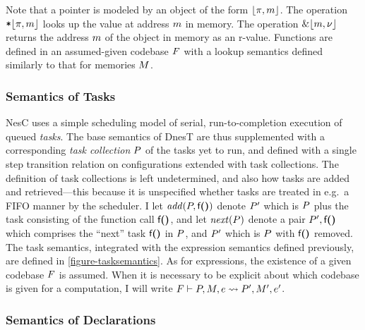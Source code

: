 \coresemanticsfig

Note that a pointer is modeled by an object of the form $\lfloor \pi,m \rfloor$. The operation
$\texttt{*}\lfloor \pi,m \rfloor$ looks up the value at address $m$ in memory. The operation
$\&\lfloor m,{\nu} \rfloor$ returns the address $m$ of the object in memory as an r-value. Functions
are defined in an assumed-given codebase $F$ with a lookup semantics defined similarly to
that for memories $M$.

\bootloadsemanticsfig

\subsubsection{Semantics of Tasks}

NesC uses a simple scheduling model of serial, run-to-completion execution of queued
\emph{tasks}. The base semantics of DnesT are thus supplemented with a corresponding \emph{task
  collection} $P$ of the tasks yet to run, and defined with a single step transition
relation on configurations extended with task collections. The definition of task collections is
left undetermined, and also how tasks are added and retrieved---this because it is unspecified
whether tasks are treated in e.g.~a FIFO manner by the scheduler. I let
$\mathit{add}(P,\textsf{f}\textbf{(}\textbf{)})$ denote $P'$ which is $P$ plus the task consisting of the
function call $\textsf{f}\textbf{(}\textbf{)}$, and let $\mathit{next}(P)$ denote a pair $P',\textsf{f}\textbf{(}\textbf{)}$
which comprises the ``next'' task $\textsf{f}\textbf{(}\textbf{)}$ in $P$, and $P'$ which is $P$
with $\textsf{f}\textbf{(}\textbf{)}$ removed. The task semantics, integrated with the expression semantics
defined previously, are defined in \autoref{figure-tasksemantics}. As for expressions, the
existence of a given codebase $F$ is assumed. When it is necessary to be explicit about
which codebase is given for a computation, I will write $F \vdash P, M, e \leadsto
P', M', e'$.

\tasksemanticsfig

\subsubsection{Semantics of Declarations}

